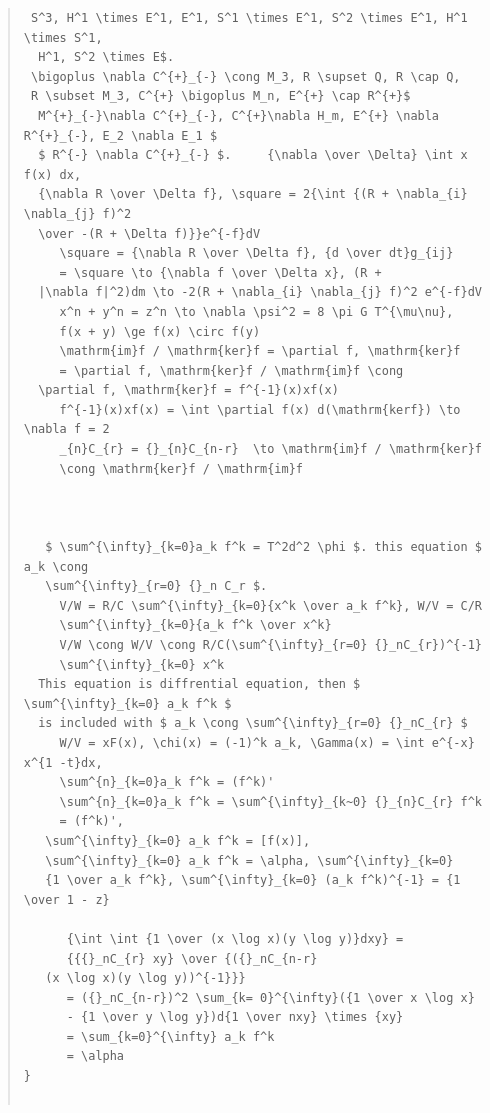 \documentclass{jsarticle}
\begin{document}
\begin{quote}
\begin{verbatim}
 S^3, H^1 \times E^1, E^1, S^1 \times E^1, S^2 \times E^1, H^1 \times S^1, 
  H^1, S^2 \times E$.  
 \bigoplus \nabla C^{+}_{-} \cong M_3, R \supset Q, R \cap Q, 
 R \subset M_3, C^{+} \bigoplus M_n, E^{+} \cap R^{+}$
  M^{+}_{-}\nabla C^{+}_{-}, C^{+}\nabla H_m, E^{+} \nabla R^{+}_{-}, E_2 \nabla E_1 $
  $ R^{-} \nabla C^{+}_{-} $.     {\nabla \over \Delta} \int x f(x) dx,
  {\nabla R \over \Delta f}, \square = 2{\int {(R + \nabla_{i} \nabla_{j} f)^2
  \over -(R + \Delta f)}}e^{-f}dV   
     \square = {\nabla R \over \Delta f}, {d \over dt}g_{ij} 
     = \square \to {\nabla f \over \Delta x}, (R + 
  |\nabla f|^2)dm \to -2(R + \nabla_{i} \nabla_{j} f)^2 e^{-f}dV   
     x^n + y^n = z^n \to \nabla \psi^2 = 8 \pi G T^{\mu\nu}, 
     f(x + y) \ge f(x) \circ f(y)   
     \mathrm{im}f / \mathrm{ker}f = \partial f, \mathrm{ker}f 
     = \partial f, \mathrm{ker}f / \mathrm{im}f \cong
  \partial f, \mathrm{ker}f = f^{-1}(x)xf(x)   
     f^{-1}(x)xf(x) = \int \partial f(x) d(\mathrm{kerf}) \to \nabla f = 2   
     _{n}C_{r} = {}_{n}C_{n-r}  \to \mathrm{im}f / \mathrm{ker}f 
     \cong \mathrm{ker}f / \mathrm{im}f   

  

   $ \sum^{\infty}_{k=0}a_k f^k = T^2d^2 \phi $. this equation $ a_k \cong 
   \sum^{\infty}_{r=0} {}_n C_r $.
     V/W = R/C \sum^{\infty}_{k=0}{x^k \over a_k f^k}, W/V = C/R
     \sum^{\infty}_{k=0}{a_k f^k \over x^k}   
     V/W \cong W/V \cong R/C(\sum^{\infty}_{r=0} {}_nC_{r})^{-1} 
     \sum^{\infty}_{k=0} x^k   
  This equation is diffrential equation, then $ \sum^{\infty}_{k=0} a_k f^k $
  is included with $ a_k \cong \sum^{\infty}_{r=0} {}_nC_{r} $
     W/V = xF(x), \chi(x) = (-1)^k a_k, \Gamma(x) = \int e^{-x} x^{1 -t}dx, 
     \sum^{n}_{k=0}a_k f^k = (f^k)'   
     \sum^{n}_{k=0}a_k f^k = \sum^{\infty}_{k~0} {}_{n}C_{r} f^k   
     = (f^k)', 
   \sum^{\infty}_{k=0} a_k f^k = [f(x)], 
   \sum^{\infty}_{k=0} a_k f^k = \alpha, \sum^{\infty}_{k=0} 
   {1 \over a_k f^k}, \sum^{\infty}_{k=0} (a_k f^k)^{-1} = {1 \over 1 - z}   

      {\int \int {1 \over (x \log x)(y \log y)}dxy} = 
      {{{}_nC_{r} xy} \over {({}_nC_{n-r} 
   (x \log x)(y \log y))^{-1}}}   
      = ({}_nC_{n-r})^2 \sum_{k= 0}^{\infty}({1 \over x \log x}
      - {1 \over y \log y})d{1 \over nxy} \times {xy}   
      = \sum_{k=0}^{\infty} a_k f^k   
      = \alpha   
}


\end{verbatim}
\end{quote}
\end{document}
